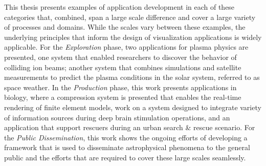 This thesis presents examples of application development in each of these categories that, combined, span a large scale difference and cover a large variety of processes and domains.  While the scales vary between these examples, the underlying principles that inform the design of visualization applications is widely applicable.  For the \emph{Exploration} phase, two applications for plasma physics are presented, one system that enabled researchers to discover the behavior of colliding ion beams; another system that combines simulations and satellite measurements to predict the plasma conditions in the solar system, referred to as space weather.  In the \emph{Production} phase, this work presents applications in biology, where a compression system is presented that enables the real-time rendering of finite element models, work on a system designed to integrate variety of information sources during deep brain stimulation operations, and an application that support rescuers during an urban search \& rescue scenario.  For the \emph{Public Dissemination}, this work shows the ongoing efforts of developing a framework that is used to disseminate astrophysical phenomena to the general public and the efforts that are required to cover these large scales seamlessly.
